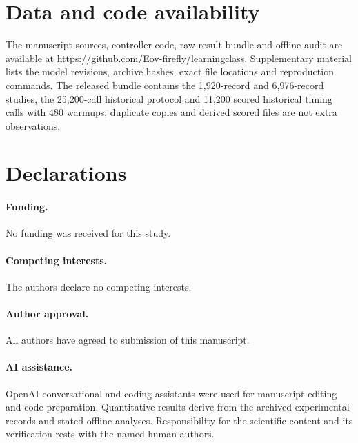 \documentclass[12pt,a4paper]{article}
\begin{document}
\section*{Data and code availability}
The manuscript sources, controller code, raw-result bundle and offline audit are available at \url{https://github.com/Eov-firefly/learningclass}. Supplementary material lists the model revisions, archive hashes, exact file locations and reproduction commands. The released bundle contains the 1,920-record and 6,976-record studies, the 25,200-call historical protocol and 11,200 scored historical timing calls with 480 warmups; duplicate copies and derived scored files are not extra observations.

\section*{Declarations}
\paragraph{Funding.} No funding was received for this study.
\paragraph{Competing interests.} The authors declare no competing interests.
\paragraph{Author approval.} All authors have agreed to submission of this manuscript.
\paragraph{AI assistance.} OpenAI conversational and coding assistants were used for manuscript editing and code preparation. Quantitative results derive from the archived experimental records and stated offline analyses. Responsibility for the scientific content and its verification rests with the named human authors.


\end{document}

